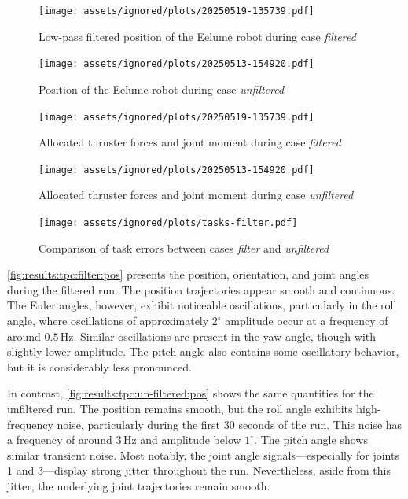 \begin{figure}[h!]
    \centering
    \texttt{[image: assets/ignored/plots/20250519-135739.pdf]}
    \caption{Low-pass filtered position of the Eelume robot during case \textit{filtered}}
    \label{fig:results:tpc:filter:pos}
\end{figure}
\begin{figure}[h!]
    \centering
    \texttt{[image: assets/ignored/plots/20250513-154920.pdf]}
    \caption{Position of the Eelume robot during case \textit{unfiltered}}
    \label{fig:results:tpc:un-filtered:pos}
\end{figure}
\begin{figure}[h!]
    \centering
    \texttt{[image: assets/ignored/plots/20250519-135739.pdf]}
    \caption{Allocated thruster forces and joint moment during case \textit{filtered}}
    \label{fig:results:tpc:filter:forces}
\end{figure}
\begin{figure}[h!]
    \centering
    \texttt{[image: assets/ignored/plots/20250513-154920.pdf]}
    \caption{Allocated thruster forces and joint moment during case \textit{unfiltered}}
    \label{fig:results:tpc:un-filtered:forces}
\end{figure}
\begin{figure}[h!]
    \centering
    \texttt{[image: assets/ignored/plots/tasks-filter.pdf]}
    \caption{Comparison of task errors between cases \textit{filter} and \textit{unfiltered}}
    \label{fig:results:tpc:filter:task-errors}
\end{figure}

\autoref{fig:results:tpc:filter:pos} presents the position, orientation, and joint angles during the filtered run. The position trajectories appear smooth and continuous. The Euler angles, however, exhibit noticeable oscillations, particularly in the roll angle, where oscillations of approximately \(2^\circ\) amplitude occur at a frequency of around \(0.5\,\mathrm{Hz}\). Similar oscillations are present in the yaw angle, though with slightly lower amplitude. The pitch angle also contains some oscillatory behavior, but it is considerably less pronounced.

In contrast, \autoref{fig:results:tpc:un-filtered:pos} shows the same quantities for the unfiltered run. The position remains smooth, but the roll angle exhibits high-frequency noise, particularly during the first 30 seconds of the run. This noise has a frequency of around \(3\,\mathrm{Hz}\) and amplitude below \(1^\circ\). The pitch angle shows similar transient noise. Most notably, the joint angle signals—especially for joints 1 and 3—display strong jitter throughout the run. Nevertheless, aside from this jitter, the underlying joint trajectories remain smooth.

